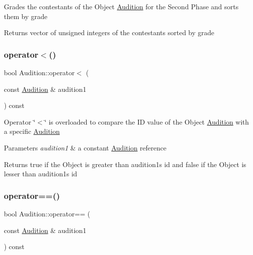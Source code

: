 Grades the contestants of the Object \hyperlink{class_audition}{Audition} for the Second Phase and sorts them by grade \begin{DoxyReturn}{Returns}
vector of unsigned integers of the contestants sorted by grade 
\end{DoxyReturn}
\mbox{\label{class_audition_ab9ceb3af47f97b5ca6e941712edf2db0}} 
\subsubsection{\texorpdfstring{operator$<$()}{operator<()}}
{\footnotesize\ttfamily bool Audition\+::operator$<$ (\begin{DoxyParamCaption}\item[{const \hyperlink{class_audition}{Audition} \&}]{audition1 }\end{DoxyParamCaption}) const}

Operator \char`\"{}$<$\char`\"{} is overloaded to compare the ID value of the Object \hyperlink{class_audition}{Audition} with a specific \hyperlink{class_audition}{Audition} 
\begin{DoxyParams}{Parameters}
{\em audition1} & a constant \hyperlink{class_audition}{Audition} reference \\
\hline
\end{DoxyParams}
\begin{DoxyReturn}{Returns}
true if the Object is greater than audition1\textquotesingle{}s id and false if the Object is lesser than audition1\textquotesingle{}s id 
\end{DoxyReturn}
\mbox{\label{class_audition_ac0cb2b6e7de7fd30691bbea60640bd2a}} 
\subsubsection{\texorpdfstring{operator==()}{operator==()}}
{\footnotesize\ttfamily bool Audition\+::operator== (\begin{DoxyParamCaption}\item[{const \hyperlink{class_audition}{Audition} \&}]{audition1 }\end{DoxyParamCaption}) const}

